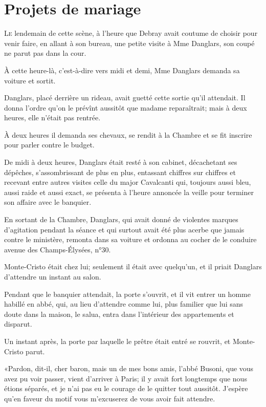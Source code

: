 \chapter{Projets de mariage}

\lettrine{L}{e} lendemain de cette scène, à l'heure que Debray avait coutume de choisir pour venir faire, en allant à son bureau, une petite visite à Mme Danglars, son coupé ne parut pas dans la cour. 

\zz
À cette heure-là, c'est-à-dire vers midi et demi, Mme Danglars demanda sa voiture et sortit. 

Danglars, placé derrière un rideau, avait guetté cette sortie qu'il attendait. Il donna l'ordre qu'on le prévînt aussitôt que madame reparaîtrait; mais à deux heures, elle n'était pas rentrée. 

À deux heures il demanda ses chevaux, se rendit à la Chambre et se fit inscrire pour parler contre le budget. 

De midi à deux heures, Danglars était resté à son cabinet, décachetant ses dépêches, s'assombrissant de plus en plus, entassant chiffres sur chiffres et recevant entre autres visites celle du major Cavalcanti qui, toujours aussi bleu, aussi raide et aussi exact, se présenta à l'heure annoncée la veille pour terminer son affaire avec le banquier.  

En sortant de la Chambre, Danglars, qui avait donné de violentes marques d'agitation pendant la séance et qui surtout avait été plus acerbe que jamais contre le ministère, remonta dans sa voiture et ordonna au cocher de le conduire avenue des Champs-Élysées, n°30. 

Monte-Cristo était chez lui; seulement il était avec quelqu'un, et il priait Danglars d'attendre un instant au salon. 

Pendant que le banquier attendait, la porte s'ouvrit, et il vit entrer un homme habillé en abbé, qui, au lieu d'attendre comme lui, plus familier que lui sans doute dans la maison, le salua, entra dans l'intérieur des appartements et disparut. 

Un instant après, la porte par laquelle le prêtre était entré se rouvrit, et Monte-Cristo parut. 

«Pardon, dit-il, cher baron, mais un de mes bons amis, l'abbé Busoni, que vous avez pu voir passer, vient d'arriver à Paris; il y avait fort longtemps que nous étions séparés, et je n'ai pas eu le courage de le quitter tout aussitôt. J'espère qu'en faveur du motif vous m'excuserez de vous avoir fait attendre. 

